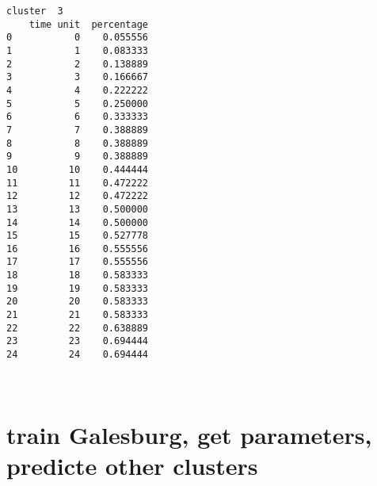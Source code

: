 \documentclass[11pt]{article}
\begin{document}
\begin{Verbatim}[commandchars=\\\{\}]
cluster  3
    time unit  percentage
0           0    0.055556
1           1    0.083333
2           2    0.138889
3           3    0.166667
4           4    0.222222
5           5    0.250000
6           6    0.333333
7           7    0.388889
8           8    0.388889
9           9    0.388889
10         10    0.444444
11         11    0.472222
12         12    0.472222
13         13    0.500000
14         14    0.500000
15         15    0.527778
16         16    0.555556
17         17    0.555556
18         18    0.583333
19         19    0.583333
20         20    0.583333
21         21    0.583333
22         22    0.638889
23         23    0.694444
24         24    0.694444

    \end{Verbatim}

    \begin{center}
    \end{center}
    { \hspace*{\fill} \\}
    
    \hypertarget{train-galesburg-get-parameters-predicte-other-clusters}{%
\section{\texorpdfstring{\textbf{train Galesburg, get parameters,
predicte other
clusters}}{train Galesburg, get parameters, predicte other clusters}}\label{train-galesburg-get-parameters-predicte-other-clusters}}
\end{document}
